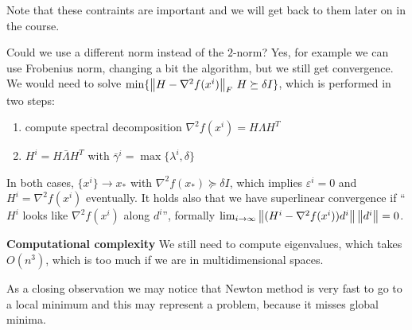 \documentclass[ComputationalMathematics.tex]{subfiles}
\begin{document}
\begin{obs}
   Note that these contraints are important and we will get back to them later on in the course.
\end{obs}
 
Could we use a different norm instead of the $2$-norm? Yes, for example we can use Frobenius norm, changing a bit the algorithm, but we still get convergence. We would need to solve $\min \{{\left\lVert H - \nabla^2 f(x^i)\right\rVert}_{F} ~ H \succeq \delta I\}$, which is performed in two steps:
\begin{enumerate}
  \item compute spectral decomposition $\nabla^2 f(x^i) = H \Lambda H^T$
  \item $H^i = H \bar{\Lambda} H^T$ with $\bar{\gamma}^i = \max \{\lambda^i, \delta\}$
\end{enumerate}
In both cases, $\{x^i\} \to x_*$ with $\nabla^2 f(x_*) \succeq \delta I$, which implies $\varepsilon^i = 0$ and $H^i = \nabla^2 f(x^i)$ eventually. It holds also that we have superlinear convergence if ``$H^i$ looks like $\nabla^2 f(x^i)$ along $d^i$'', formally $\lim_{i \to \infty} \left\lVert(H^i - \nabla^2 f(x^i)) d^i\right\rVert \left\lVert d^i\right\rVert = 0$.

\begin{myframe}{\bf Computational complexity}
We still need to compute eigenvalues, which takes $O(n^3)$, which is too much if we are in multidimensional spaces.
\end{myframe}

As a closing observation we may notice that Newton method is very fast to go to a local minimum and this may represent a problem, because it misses global minima.
\end{document}
